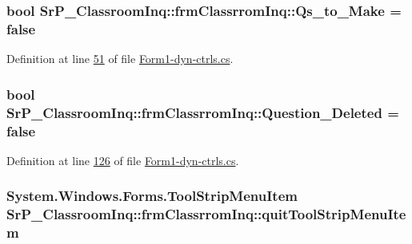 \hypertarget{class_sr_p___classroom_inq_1_1frm_classrrom_inq_a74b0b2afc18cdf1d19dc415ab870e68b}{
\subsubsection[{\-Qs\-\_\-to\-\_\-\-Make}]{\setlength{\rightskip}{0pt plus 5cm}bool {\bf \-Sr\-P\-\_\-\-Classroom\-Inq\-::frm\-Classrrom\-Inq\-::\-Qs\-\_\-to\-\_\-\-Make} = false}}
\label{class_sr_p___classroom_inq_1_1frm_classrrom_inq_a74b0b2afc18cdf1d19dc415ab870e68b}


\-Definition at line \hyperlink{_form1-dyn-ctrls_8cs_source_l00051}{51} of file \hyperlink{_form1-dyn-ctrls_8cs_source}{\-Form1-\/dyn-\/ctrls.\-cs}.

\hypertarget{class_sr_p___classroom_inq_1_1frm_classrrom_inq_a8f54ae3a0ea7bb9dafed984a53155fd8}{
\subsubsection[{\-Question\-\_\-\-Deleted}]{\setlength{\rightskip}{0pt plus 5cm}bool {\bf \-Sr\-P\-\_\-\-Classroom\-Inq\-::frm\-Classrrom\-Inq\-::\-Question\-\_\-\-Deleted} = false}}
\label{class_sr_p___classroom_inq_1_1frm_classrrom_inq_a8f54ae3a0ea7bb9dafed984a53155fd8}


\-Definition at line \hyperlink{_form1-dyn-ctrls_8cs_source_l00126}{126} of file \hyperlink{_form1-dyn-ctrls_8cs_source}{\-Form1-\/dyn-\/ctrls.\-cs}.

\hypertarget{class_sr_p___classroom_inq_1_1frm_classrrom_inq_a7e4ada35eda1d7984167b62ab487ace7}{
\subsubsection[{quit\-Tool\-Strip\-Menu\-Item}]{\setlength{\rightskip}{0pt plus 5cm}\-System.\-Windows.\-Forms.\-Tool\-Strip\-Menu\-Item {\bf \-Sr\-P\-\_\-\-Classroom\-Inq\-::frm\-Classrrom\-Inq\-::quit\-Tool\-Strip\-Menu\-Item}}}
\label{class_sr_p___classroom_inq_1_1frm_classrrom_inq_a7e4ada35eda1d7984167b62ab487ace7}



